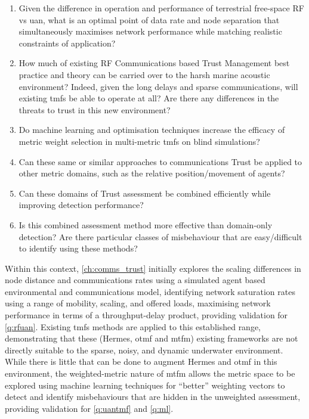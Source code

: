 \begin{enumerate}[label=\textbf{PSQ.\arabic*},ref=\emph{PSQ. \arabic*}]
	\item Given the difference in operation and performance of terrestrial free-space RF vs \gls{uan}, what is an optimal point of data rate and node separation that simultaneously maximises network performance while matching realistic constraints of application?
	\item How much of existing RF Communications based Trust Management best practice and theory can be carried over to the harsh marine acoustic environment? Indeed, given the long delays and sparse communications, will existing \glspl{tmf} be able to operate at all? Are there any differences in the threats to trust in this new environment?
	\item Do machine learning and optimisation techniques increase the efficacy of metric weight selection in multi-metric \glspl{tmf} on blind simulations?
	\item Can these same or similar approaches to communications Trust be applied to other metric domains, such as the relative position/movement of agents?
	\item Can these domains of Trust assessment be combined efficiently while improving detection performance?
	\item Is this combined assessment method more effective than domain-only detection? Are there particular classes of misbehaviour that are easy/difficult to identify using these methods? 
\end{enumerate}

Within this context, \autoref{ch:comms_trust} initially explores the scaling differences in node distance and communications rates using a simulated agent based environmental and communications model, identifying network saturation rates using a range of mobility, scaling, and offered loads, maximising network performance in terms of a throughput-delay product, providing validation for \autoref{q:rfuan}.
Existing \glspl{tmf} methods are applied to this established range, demonstrating that these (Hermes, \gls{otmf} and \gls{mtfm}) existing frameworks are not directly suitable to the sparse, noisy, and dynamic underwater environment.
While there is little that can be done to augment Hermes and \gls{otmf} in this environment, the weighted-metric nature of \gls{mtfm} allows the metric space to be explored using machine learning techniques for ``better'' weighting vectors to detect and identify misbehaviours that are hidden in the unweighted assessment, providing validation for \autoref{q:uantmf} and \autoref{q:ml}.

